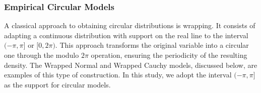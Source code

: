 \documentclass[remotesensing,article,submit,pdftex,moreauthors]{Definitions/mdpi}
\begin{document}
\subsubsection{Empirical Circular Models}\label{subsec:circulars_models}


A classical approach to obtaining circular distributions is wrapping.
It consists of adapting a continuous distribution with support on the real line to the interval $(-\pi, \pi]$ or $[0, 2\pi)$. 
This approach transforms the original variable into a circular one through the modulo $2\pi$ operation, ensuring the periodicity of the resulting density. 
The Wrapped Normal and Wrapped Cauchy models, discussed below, are examples of this type of construction. 
In this study, we adopt the interval $(-\pi, \pi]$ as the support for circular models. 

\end{document}
